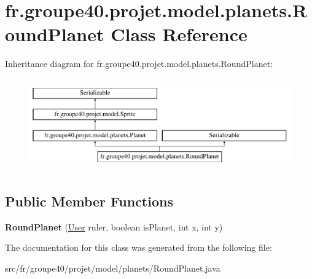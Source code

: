 \hypertarget{classfr_1_1groupe40_1_1projet_1_1model_1_1planets_1_1_round_planet}{}\section{fr.\+groupe40.\+projet.\+model.\+planets.\+Round\+Planet Class Reference}
\label{classfr_1_1groupe40_1_1projet_1_1model_1_1planets_1_1_round_planet}
Inheritance diagram for fr.\+groupe40.\+projet.\+model.\+planets.\+Round\+Planet\+:\begin{figure}[H]
\begin{center}
\leavevmode
\includegraphics[height=4.000000cm]{classfr_1_1groupe40_1_1projet_1_1model_1_1planets_1_1_round_planet}
\end{center}
\end{figure}
\subsection*{Public Member Functions}
\begin{DoxyCompactItemize}
\item 
\mbox{\label{classfr_1_1groupe40_1_1projet_1_1model_1_1planets_1_1_round_planet_a48bb1db2b253cfc635bf1c3a8a55df13}} 
{\bfseries Round\+Planet} (\mbox{\hyperlink{classfr_1_1groupe40_1_1projet_1_1client_1_1_user}{User}} ruler, boolean is\+Planet, int x, int y)
\end{DoxyCompactItemize}


The documentation for this class was generated from the following file\+:\begin{DoxyCompactItemize}
\item 
src/fr/groupe40/projet/model/planets/Round\+Planet.\+java\end{DoxyCompactItemize}
